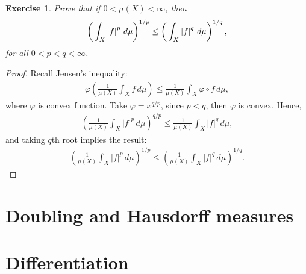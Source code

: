 \documentclass[11pt]{book}
\newtheorem{exercise}{Exercise}[section]
\theoremstyle{definition}
\numberwithin{equation}{chapter}
\def\avint{\,\ThisStyle{\ensurestackMath{%
  \stackinset{c}{.2\LMpt}{c}{1\LMpt}{\SavedStyle-}{\SavedStyle\phantom{\int}}}%
  \setbox0=\hbox{$\SavedStyle\int\,$}\kern-\wd0}\int}
\begin{document}
\medskip

\begin{exercise}
Prove that if $0 < \mu(X) < \infty$, then
\begin{align*}
    \left(\avint_X \left|f\right|^p \,d\mu \right)^{1/p} \leq \left(\avint_X \left|f\right|^q \,d\mu \right)^{1/q},
\end{align*}
for all $0 < p < q < \infty$.
\end{exercise}
\begin{proof}
Recall Jensen's inequality:
\begin{align*}
    \varphi\left(\frac{1}{\mu(X)} \int_X f\,d\mu \right) \leq \frac{1}{\mu(X)} \int_X \varphi \circ f\,d\mu,
\end{align*}
where $\varphi$ is convex function. Take $\varphi = x^{q/p}$, since $p < q$, then $\varphi$ is convex. Hence,
\begin{align*}
    \left(\frac{1}{\mu(X)} \int_X \left|f\right|^p\,d\mu \right)^{q/p} \leq \frac{1}{\mu(X)} \int_X \left|f\right|^q\,d\mu,
\end{align*}
and taking $q$th root implies the result:
\begin{align*}
    \left(\frac{1}{\mu(X)} \int_X \left|f\right|^p\,d\mu \right)^{1/p} \leq \left(\frac{1}{\mu(X)} \int_X \left|f\right|^q\,d\mu\right)^{1/q}.
\end{align*}
\end{proof}

\medskip

\section{Doubling and Hausdorff measures}



\medskip

\section{Differentiation}
\end{document}
